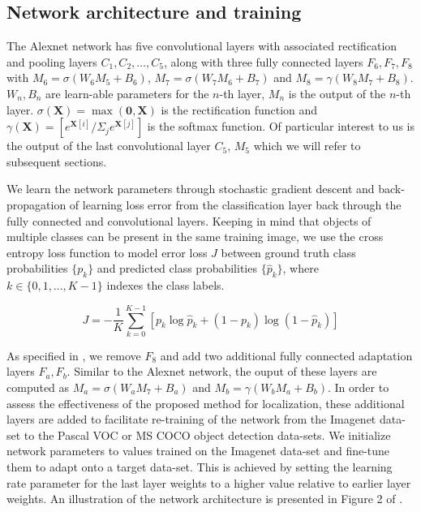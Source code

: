 \documentclass[runningheads]{llncs}
\begin{document}
\subsection{Network architecture and training}\label{subsection:network}
The Alexnet network  has five convolutional layers with associated rectification and  pooling layers $C_1, C_2,\ldots, C_5$, along with three fully connected layers $F_6, F_7, F_8$ with $M_6 = \sigma(W_6 M_5 + B_6)$, $M_7 = \sigma(W_7 M_6 + B_7)$ and $M_8 = \gamma(W_8 M_7 + B_8)$. $W_n, B_n$ are learn-able parameters  for the $n$-th layer, $M_n$ is the output of the $n$-th layer. $\sigma(\textbf{X}) = \max(\textbf{0}, \textbf{X})$ is the rectification function and $\gamma(\textbf{X}) = [e^{\textbf{X}[i]}/\Sigma_{j}e^{\textbf{X}[j]}]$ is the softmax function. Of particular interest to us is the output of the last convolutional layer $C_5$, $M_5$ which we will refer to subsequent sections.

We learn the network parameters through stochastic gradient descent and back-propagation of learning loss error \cite{rumelhart1988learning} from the classification layer back through the fully connected and convolutional layers. Keeping in mind that objects of multiple classes can be present in the same training image, we use the cross entropy loss function to model error loss $J$ between ground truth class probabilities $\{{p_{k}}\}$ and predicted class probabilities $\{{\hat{p}_k}\}$, where $k \in \{ 0, 1, ... , K-1\}$ indexes the class labels.

\begin{equation}
J = -\frac{1}{K}\sum_{k=0}^{K-1}[p_{k} \log\hat{p}_{k} + (1-p_{k}) \log(1-\hat{p}_{k})]
\end{equation}

As specified in \cite{Oquab14}, we remove $F_8$ and add two additional fully connected adaptation layers $F_{a}, F_{b}$. Similar to the Alexnet network, the ouput of these layers are computed as $M_a = \sigma(W_a M_7 + B_a)$ and $M_b = \gamma(W_b M_a + B_b)$. In order to assess the effectiveness of the proposed method for localization, these additional layers are added to facilitate re-training of the network from the Imagenet data-set to the Pascal VOC or MS COCO object detection data-sets. We  initialize network parameters to values trained on the Imagenet data-set and fine-tune them \cite{karayev2013recognizing} to adapt onto a target data-set. This is achieved by setting the learning rate parameter  for the last layer weights to a higher value relative to earlier layer weights. An illustration of the network architecture is presented in Figure 2 of \cite{Oquab14}.
\end{document}
